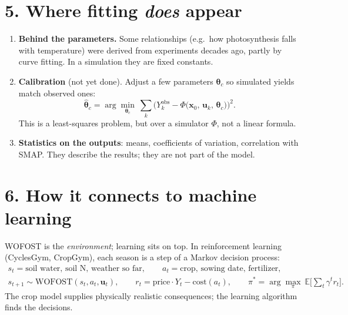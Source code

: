 \documentclass[11pt,a4paper]{article}
\begin{document}
\section*{5. Where fitting \emph{does} appear}

\begin{enumerate}[nosep]
  \item \textbf{Behind the parameters.} Some relationships (e.g.\ how photosynthesis falls with temperature) were derived
        from experiments decades ago, partly by curve fitting. In a simulation they are fixed constants.
  \item \textbf{Calibration} (not yet done). Adjust a few parameters \(\boldsymbol\theta_c\) so simulated yields match
        observed ones:
        \begin{equation}
          \hat{\boldsymbol\theta}_c = \arg\min_{\boldsymbol\theta_c}\ \sum_{k}
          \Big(Y^{\mathrm{obs}}_k - \Phi\big(\mathbf{x}_0,\, \mathbf{u}_k,\, \boldsymbol\theta_c\big)\Big)^2 .
        \end{equation}
        This is a least-squares problem, but over a simulator \(\Phi\), not a linear formula.
  \item \textbf{Statistics on the outputs}: means, coefficients of variation, correlation with SMAP. They describe the
        results; they are not part of the model.
\end{enumerate}

\section*{6. How it connects to machine learning}

WOFOST is the \emph{environment}; learning sits on top. In reinforcement learning (CyclesGym, CropGym), each season is a
step of a Markov decision process:
\begin{gather}
  s_t = \text{soil water, soil N, weather so far},\qquad
  a_t = \text{crop, sowing date, fertilizer},\\
  s_{t+1} \sim \text{WOFOST}(s_t, a_t, \mathbf{u}_t),\qquad
  r_t = \text{price}\cdot Y_t - \text{cost}(a_t),\qquad
  \pi^* = \arg\max_\pi\ \mathbb{E}\Big[\sum_t \gamma^t r_t\Big].
\end{gather}
The crop model supplies physically realistic consequences; the learning algorithm finds the decisions.
\end{document}
